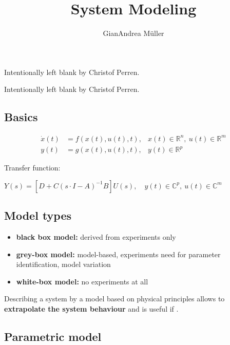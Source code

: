 \documentclass[10pt,a4paper]{scrartcl}
\title{System Modeling}
\author{GianAndrea Müller}
\begin{document}
\begin{multicols*}{4}
\maketitle
\tableofcontents
\end{multicols*}

\newpage

Intentionally left blank by Christof Perren.

\newpage

Intentionally left blank by Christof Perren.

\newpage

\begin{multicols*}{3}

\section{Basics}


\begin{align*}
\dot{x}(t)&=f(x(t),u(t),t),&x(t)\in\mathbb{R}^n,\ u(t)\in\mathbb{R}^m\\
y(t)&=g(x(t),u(t),t),&y(t)\in\mathbb{R}^p
\end{align*}


Transfer function:

\small
$Y(s)=\left[D+C(s\cdot I-A)^{-1}B\right]U(s),\quad y(t)\in\mathbb{C}^p,\ u(t)\in\mathbb{C}^m$\normalsize

\subsection{Model types}

\begin{itemize}
\item \textbf{black box model:} derived from experiments only
\item \textbf{grey-box model:} model-based, experiments need for parameter identification, model variation
\item \textbf{white-box model:} no experiments at all
\end{itemize}

Describing a system by a model based on physical principles allows to \textbf{extrapolate the system behaviour} and is useful if .

\subsection{Parametric model}


\end{multicols*}
\end{document}
